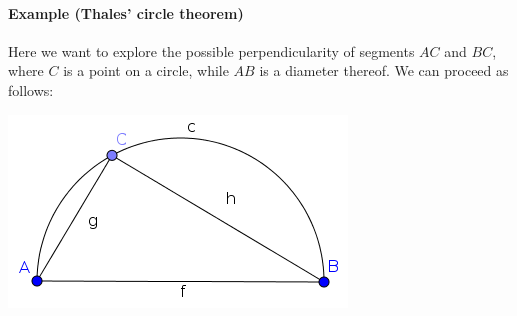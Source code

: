 \documentclass{article}
\begin{document}
\paragraph{Example (Thales' circle theorem)}
\label{par:Thales}
Here we want to explore the possible perpendicularity of segments $AC$ and $BC$, where $C$ is a point on a circle, while $AB$ is a diameter thereof. We can proceed as follows:
\begin{center}
\includegraphics[scale=0.5]{Relation-example}
\end{center}
\end{document}
